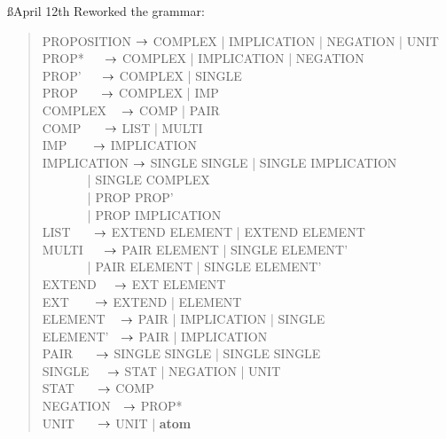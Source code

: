 \documentclass[a4paper]{article}
\begin{document}
\ss{April 12th}
Reworked the grammar:
\begin{quote}
\ttfamily
PROPOSITION $\rightarrow$ COMPLEX | IMPLICATION | NEGATION | UNIT\\
PROP* \(~~~~~~\)$\rightarrow$ COMPLEX | IMPLICATION | NEGATION\\
PROP' \(~~~~~~\)$\rightarrow$ COMPLEX | SINGLE\\
PROP \(~~~~~~~\)$\rightarrow$ COMPLEX | IMP\\
COMPLEX \(~~~~\)$\rightarrow$ COMP | PAIR\\
COMP \(~~~~~~~\)$\rightarrow$ LIST | MULTI\\
IMP \(~~~~~~~~\)$\rightarrow$ IMPLICATION\\
IMPLICATION $\rightarrow$ SINGLE  SINGLE
                    | SINGLE  IMPLICATION\\
\(~~~~~~~~~~~~~~~\) |
 SINGLE  COMPLEX\\
\(~~~~~~~~~~~~~~~\) |
 PROP  PROP'\\
\(~~~~~~~~~~~~~~~\) |
 PROP  
IMPLICATION\\
LIST \(~~~~~~~\)$\rightarrow$ EXTEND ELEMENT |
                      EXTEND ELEMENT\\
MULTI \(~~~~~~\)$\rightarrow$ PAIR \: ELEMENT |
                      SINGLE  ELEMENT'\\
\(~~~~~~~~~~~~~~~\) | PAIR  ELEMENT  |
                      SINGLE  ELEMENT'\\
EXTEND \(~~~~~\)$\rightarrow$ EXT\txt{,} ELEMENT\\
EXT \(~~~~~~~~\)$\rightarrow$ EXTEND | ELEMENT\\
ELEMENT \(~~~~\)$\rightarrow$ PAIR | IMPLICATION | SINGLE\\
ELEMENT' \(~~~\)$\rightarrow$ PAIR | IMPLICATION\\
PAIR \(~~~~~~~\)$\rightarrow$ SINGLE   SINGLE | SINGLE  SINGLE\\
SINGLE \(~~~~~\)$\rightarrow$ STAT | NEGATION | UNIT\\
STAT \(~~~~~~~\)$\rightarrow$ COMP\\
NEGATION \(~~~\)$\rightarrow$ PROP*\\
UNIT \(~~~~~~~\)$\rightarrow$ UNIT | {\bf atom}\\
\end{quote}
\end{document}
